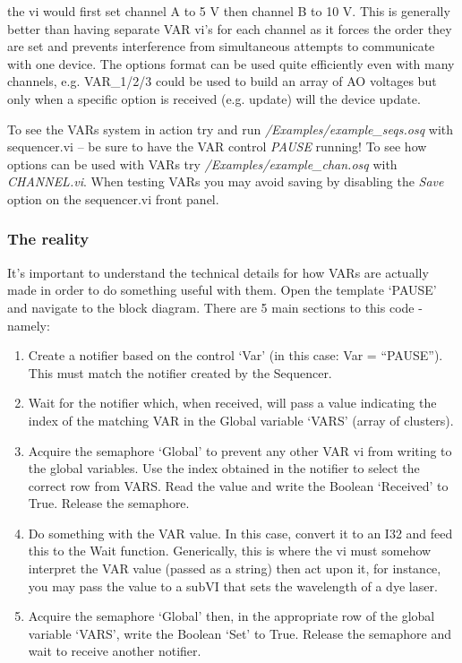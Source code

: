 \documentclass[10pt,a4paper]{article}
\begin{document}
\noindent the vi would first set channel A to 5 V then channel B to 10 V.  This is generally better than having separate VAR vi's for each channel as it forces the order they are set and prevents interference from simultaneous attempts to communicate with one device.  The options format can be used quite efficiently even with many channels, e.g. VAR\_1/2/3 could be used to build an array of AO voltages but only when a specific option is received (e.g. update) will the device update.

To see the VARs system in action try and run \emph{/Examples/example\_seqs.osq} with sequencer.vi -- be sure to have the VAR control \emph{PAUSE} running!  To see how options can be used with VARs try \emph{/Examples/example\_chan.osq} with \emph{CHANNEL.vi}. When testing VARs you may avoid saving by disabling the \emph{Save} option on the sequencer.vi front panel.

\subsubsection{The reality}

It's important to understand the technical details for how VARs are actually made in order to do something useful with them.  Open the template `PAUSE' and navigate to the block diagram.  There are 5 main sections to this code - namely:

\begin{enumerate}
	\item %
	Create a notifier based on the control `Var' (in this case: Var = ``PAUSE'').  This must match the notifier created by the Sequencer.
	\item %
	Wait for the notifier which, when received, will pass a value indicating the index of the matching VAR in the Global variable `VARS' (array of clusters).
	\item %
	Acquire the semaphore `Global' to prevent any other VAR vi from writing to the global variables.  Use the index obtained in the notifier to select the correct row from VARS.  Read the value and write the Boolean `Received' to True.  Release the semaphore.
	\item %
	Do something with the VAR value.  In this case, convert it to an I32 and feed this to the  Wait function.  Generically, this is where the vi must somehow interpret the VAR value (passed as a string) then act upon it, for instance, you may pass the value to a subVI that sets the wavelength of a dye laser.
	\item %
	Acquire the semaphore `Global' then, in the appropriate row of the global variable `VARS', write the Boolean `Set' to True.   Release the semaphore and wait to receive another notifier.
\end{enumerate} 
\end{document}
